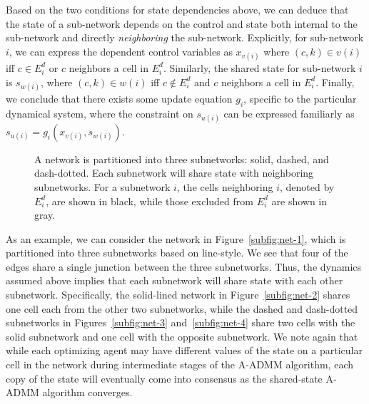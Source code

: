Based on the two conditions for state dependencies above, we can deduce that the state of a sub-network depends on the control and state both internal to the sub-network and directly \emph{neighboring} the sub-network. Explicitly, for sub-network $i$, we can express the dependent control variables as $x_{v\left(i\right)}$ where $\left(c,k\right)\in v\left(i\right)$ iff $c \in E^d_i$ or $c$ neighbors a cell in $E^d_i$. Similarly, the shared state for sub-network $i$ is $s_{w\left(i\right)}$, where $\left(c,k\right)\in w\left(i\right)$ iff $c \notin E^d_i$ and $c$ neighbors a cell in $E^d_i$. Finally, we conclude that there exists some update equation $g_i$, specific to the particular dynamical system, where the constraint on $s_{u\left(i\right)}$ can be expressed familiarly as $s_{u\left(i\right)} = g_i\left(x_{v\left(i\right)}, s_{w\left(i\right)}\right)$.

\begin{figure}
   \hfill
  \hfill
   \hfill
  \label{fig:net-example}
  \caption{A network is partitioned into three subnetworks: solid, dashed, and dash-dotted. Each subnetwork will share state with neighboring subnetworks. For a subnetwork $i$, the cells neighboring $i$, denoted by $E^d_i$, are shown in black, while those excluded from $E^d_i$ are shown in gray.}
\end{figure}

As an example, we can consider the network in Figure~\ref{subfig:net-1}, which is partitioned into three subnetworks based on line-style. We see that four of the edges share a single junction between the three subnetworks. Thus, the dynamics assumed above implies that each subnetwork will share state with each other subnetwork. Specifically, the solid-lined network in Figure~\ref{subfig:net-2} shares one cell each from the other two subnetworks, while the dashed and dash-dotted subnetworks in Figures~\ref{subfig:net-3} and~\ref{subfig:net-4} share two cells with the solid subnetwork and one cell with the opposite subnetwork. We note again that while each optimizing agent may have different values of the state on a particular cell in the network during intermediate stages of the A-ADMM algorithm, each copy of the state will eventually come into consensus as the shared-state A-ADMM algorithm converges.

